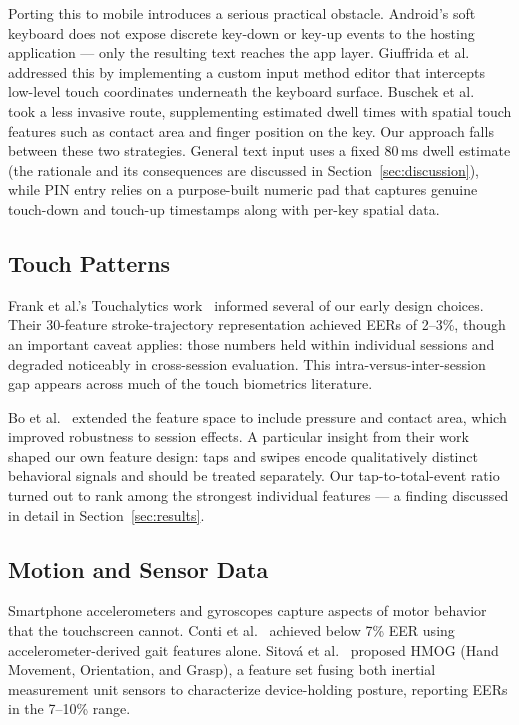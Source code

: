 \documentclass[conference]{IEEEtran}
\begin{document}
Porting this to mobile introduces a serious practical obstacle. Android's soft keyboard does not expose discrete key-down or key-up events to the hosting application --- only the resulting text reaches the app layer. Giuffrida et al.~\cite{giuffrida2014itsme} addressed this by implementing a custom input method editor that intercepts low-level touch coordinates underneath the keyboard surface. Buschek et al.~\cite{buschek2015touchalytics} took a less invasive route, supplementing estimated dwell times with spatial touch features such as contact area and finger position on the key. Our approach falls between these two strategies. General text input uses a fixed 80\,ms dwell estimate (the rationale and its consequences are discussed in Section~\ref{sec:discussion}), while PIN entry relies on a purpose-built numeric pad that captures genuine touch-down and touch-up timestamps along with per-key spatial data.

\subsection{Touch Patterns}

Frank et al.'s Touchalytics work~\cite{frank2013touchalytics} informed several of our early design choices. Their 30-feature stroke-trajectory representation achieved EERs of 2--3\%, though an important caveat applies: those numbers held within individual sessions and degraded noticeably in cross-session evaluation. This intra-versus-inter-session gap appears across much of the touch biometrics literature.

Bo et al.~\cite{bo2013silentsense} extended the feature space to include pressure and contact area, which improved robustness to session effects. A particular insight from their work shaped our own feature design: taps and swipes encode qualitatively distinct behavioral signals and should be treated separately. Our tap-to-total-event ratio turned out to rank among the strongest individual features --- a finding discussed in detail in Section~\ref{sec:results}.

\subsection{Motion and Sensor Data}

Smartphone accelerometers and gyroscopes capture aspects of motor behavior that the touchscreen cannot. Conti et al.~\cite{conti2011mobileauth} achieved below 7\% EER using accelerometer-derived gait features alone. Sitov\'{a} et al.~\cite{sitova2016hmog} proposed HMOG (Hand Movement, Orientation, and Grasp), a feature set fusing both inertial measurement unit sensors to characterize device-holding posture, reporting EERs in the 7--10\% range.
\end{document}
